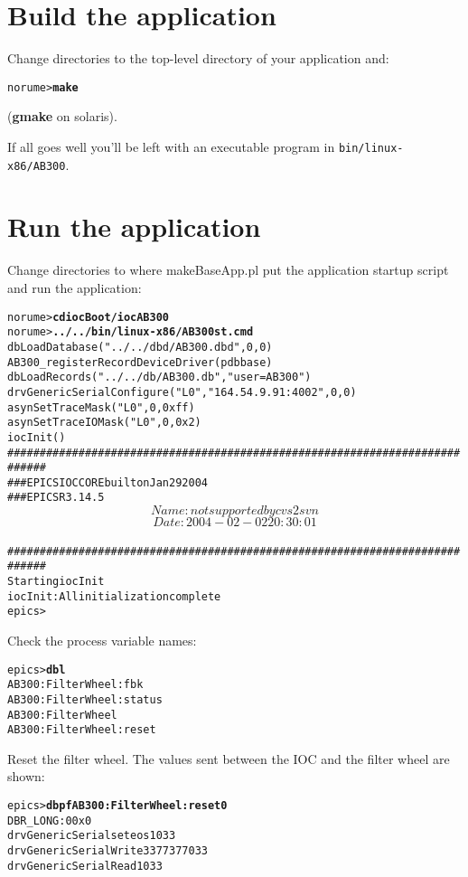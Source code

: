 \documentclass[twoside]{article}
\begin{document}
\section{Build the application}
Change directories to the top-level directory of your application and:
\begin{alltt}
norume> {\bf make}
\end{alltt}
({\bf gmake} on solaris).

If all goes well you'll be left with an executable program in
{\tt bin/linux-x86/AB300}.



\section{Run the application}
Change directories to where makeBaseApp.pl put the application startup script
and run the application:
\begin{alltt}
norume> {\bf cd iocBoot/iocAB300}
norume> {\bf ../../bin/linux-x86/AB300 st.cmd}
dbLoadDatabase("../../dbd/AB300.dbd",0,0)
AB300_registerRecordDeviceDriver(pdbbase) 
dbLoadRecords("../../db/AB300.db","user=AB300")
drvGenericSerialConfigure("L0","164.54.9.91:4002",0,0)
asynSetTraceMask("L0",0,0xff)
asynSetTraceIOMask("L0",0,0x2)
iocInit()
############################################################################
###  EPICS IOC CORE built on Jan 29 2004
###  EPICS R3.14.5 $$Name: not supported by cvs2svn $$ $$Date: 2004-02-02 20:30:01 $$
############################################################################
Starting iocInit
iocInit: All initialization complete
epics>
\end{alltt}

Check the process variable names:
\begin{alltt}
epics> {\bf dbl}
AB300:FilterWheel:fbk
AB300:FilterWheel:status
AB300:FilterWheel
AB300:FilterWheel:reset
\end{alltt}

Reset the filter wheel.  The values sent between the IOC and the filter wheel
are shown:
\begin{alltt}
epics> {\bf dbpf AB300:FilterWheel:reset 0}
DBR_LONG:           0         0x0                 
drvGenericSerial set eos 1 \verb@\@033
drvGenericSerialWrite 3 \verb@\@377\verb@\@377\verb@\@033
drvGenericSerialRead 1 \verb@\@033
\end{alltt}
\end{document}
